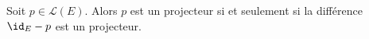 Soit $p\in \mathcal{L}(E)$. Alors $p$ est un projecteur si et seulement si la différence $\id_E - p$ est un projecteur.

\begin{reponses}
\end{reponses}

